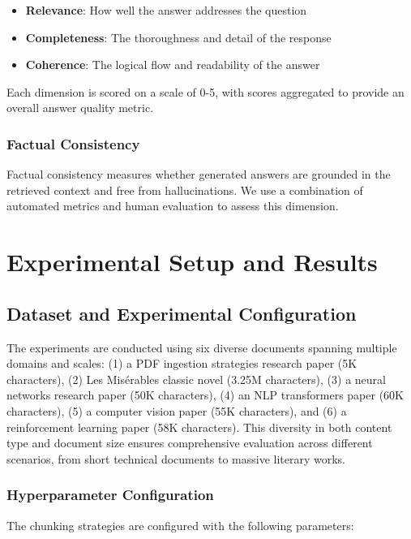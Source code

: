 \documentclass[11pt,a4paper]{article}
\begin{document}
\begin{itemize}
\item \textbf{Relevance}: How well the answer addresses the question
\item \textbf{Completeness}: The thoroughness and detail of the response
\item \textbf{Coherence}: The logical flow and readability of the answer
\end{itemize}

Each dimension is scored on a scale of 0-5, with scores aggregated to provide an overall answer quality metric.

\subsubsection{Factual Consistency}

Factual consistency measures whether generated answers are grounded in the retrieved context and free from hallucinations. We use a combination of automated metrics and human evaluation to assess this dimension.

\section{Experimental Setup and Results}

\subsection{Dataset and Experimental Configuration}

The experiments are conducted using six diverse documents spanning multiple domains and scales: (1) a PDF ingestion strategies research paper (5K characters), (2) Les Misérables classic novel (3.25M characters), (3) a neural networks research paper (50K characters), (4) an NLP transformers paper (60K characters), (5) a computer vision paper (55K characters), and (6) a reinforcement learning paper (58K characters). This diversity in both content type and document size ensures comprehensive evaluation across different scenarios, from short technical documents to massive literary works.

\subsubsection{Hyperparameter Configuration}

The chunking strategies are configured with the following parameters:
\end{document}
